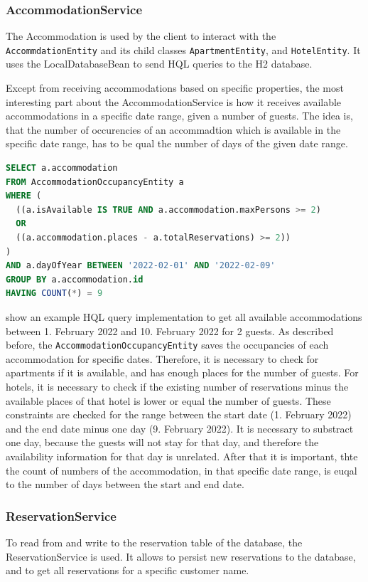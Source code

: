 \subsubsection{AccommodationService}\label{sec:02_impl_beans_acc}
The Accommodation is used by the client to interact with the \texttt{AccommdationEntity} and its child classes \texttt{ApartmentEntity}, and \texttt{HotelEntity}. It uses the LocalDatabaseBean to send HQL queries to the H2 database.

Except from receiving accommodations based on specific properties, the most interesting part about the AccommodationService is how it receives available accommodations in a specific date range, given a number of guests.
The idea is, that the number of occurencies of an accommadtion which is available in the specific date range, has to be qual the number of days of the given date range.
\begin{lstlisting}[label=lst:02_impl_ejb_accommodation_sql, caption=Example of a HQL query to receive all available accommodations, language=sql]
SELECT a.accommodation
FROM AccommodationOccupancyEntity a
WHERE (
  ((a.isAvailable IS TRUE AND a.accommodation.maxPersons >= 2) 
  OR 
  ((a.accommodation.places - a.totalReservations) >= 2))
)
AND a.dayOfYear BETWEEN '2022-02-01' AND '2022-02-09'
GROUP BY a.accommodation.id
HAVING COUNT(*) = 9 
\end{lstlisting}
 show an example HQL query implementation to get all available accommodations between 1. February 2022 and 10. February 2022 for 2 guests.
As described before, the \texttt{AccommodationOccupancyEntity} saves the occupancies of each accommodation for specific dates. Therefore, it is necessary to check for apartments if it is available, and has enough places for the number of guests. For hotels, it is necessary to check if the existing number of reservations minus the available places of that hotel is lower or equal the number of guests.
These constraints are checked for the range between the start date (1. February 2022) and the end date minus one day (9. February 2022). It is necessary to substract one day, because the guests will not stay for that day, and therefore the availability information for that day is unrelated.
After that it is important, thte the count of numbers of the accommodation, in that specific date range, is euqal to the number of days between the start and end date.


\subsubsection{ReservationService}\label{sec:02_impl_beans_reservation}
To read from and write to the reservation table of the database, the ReservationService is used. It allows to persist new reservations to the database, and to get all reservations for a specific customer name.

